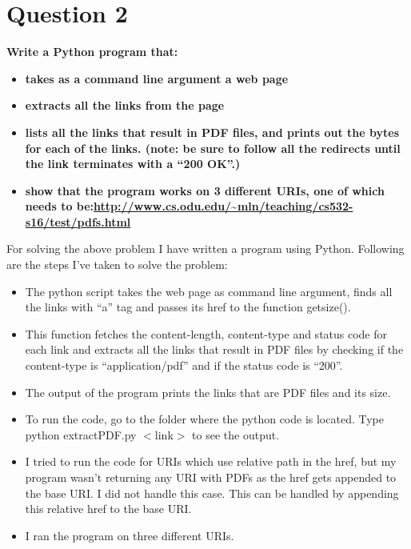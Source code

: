 \chapter{Question 2}
\label{avoiding-uri-aliases} 

\textbf{Write a Python program that:}

\begin{itemize}
\item\textbf{takes as a command line argument a web page}
\item\textbf{extracts all the links from the page}
\item \textbf{lists all the links that result in PDF files, and prints out the bytes for each of the links.  (note: be sure to follow  all the redirects until the link terminates with a ``200 OK''.)}
\item \textbf{show that the program works on 3 different URIs, one of which needs to be:{\url {http://www.cs.odu.edu/~mln/teaching/cs532-s16/test/pdfs.html}}} 
\end{itemize}
For solving the above problem I have written a program using Python. Following are the steps I've taken to solve the problem: 
\begin{itemize}
\item  The python script takes the web page as command line argument, finds all the links with ``a'' tag and passes its href to the function getsize().

\item This function fetches the content-length, content-type and status code for each link and extracts all the links that result in PDF files by checking if the content-type is ``application/pdf'' and if the status code is ``200''.

\item The output of the program prints the links that are PDF files and its size.
\end{itemize}
\newpage


\begin{itemize}
\item To run the code, go to the folder where the python code is located. Type {\color{blue} python extractPDF.py $<$link$>$} to see the output.
\item I tried to run the code for URIs which use relative path in the href, but my program wasn't returning any URI with PDFs as the href gets appended to the base URI. I did not handle this case. This can be handled by appending this relative href to the base URI.
\item I ran the program on three different URIs.
\end{itemize}

